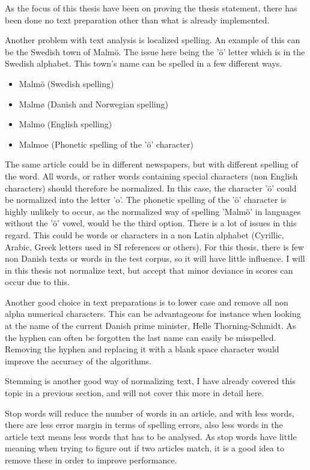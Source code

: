 As the focus of this thesis have been on proving the thesis statement, there has been done no text preparation other than what is already implemented.

Another problem with text analysis is localized spelling. An example of this can be the Swedish town of Malmö. The issue here being the 'ö' letter which is in the Swedish alphabet. This town's name can be spelled in a few different ways.


\begin{itemize}
\item Malmö (Swedish spelling)
\item Malmø (Danish and Norwegian spelling)
\item Malmo (English spelling)
\item Malmoe (Phonetic spelling of the 'ö' character)
\end{itemize}

The same article could be in different newspapers, but with different spelling of the word. All words, or rather words containing special characters (non English characters) should therefore be normalized. In this case, the character 'ö' could be normalized into the letter 'o'. The phonetic spelling of the 'ö' character is highly unlikely to occur, as the normalized way of spelling 'Malmö' in languages without the 'ö' vowel, would be the third option. There is a lot of issues in this regard. This could be words or characters in a non Latin alphabet (Cyrillic, Arabic, Greek letters used in SI references or others). For this thesis, there is few non Danish texts or words in the test corpus, so it will have little influence. I will in this thesis not normalize text, but accept that minor deviance in scores can occur due to this.

Another good choice in text preparations is to lower case and remove all non alpha numerical characters. This can be advantageous for instance when looking at the name of the current Danish prime minister, Helle Thorning-Schmidt. As the hyphen can often be forgotten the last name can easily be misspelled. Removing the hyphen and replacing it with a blank space character would improve the accuracy of the algorithms. 

Stemming is another good way of normalizing text, I have already covered this topic in a previous section, and will not cover this more in detail here. 

Stop words will reduce the number of words in an article, and with less words, there are less error margin in terms of spelling errors, also less words in the article text means less words that has to be analysed. As stop words have little meaning when trying to figure out if two articles match, it is a good idea to remove these in order to improve performance. 

